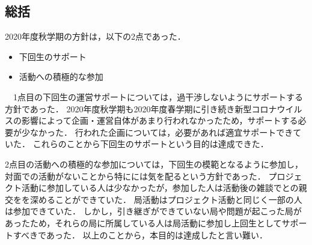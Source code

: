 \subsection*{\thirdGrade{}総括}


2020年度秋学期の\thirdGrade{}方針は，以下の2点であった．
\begin{itemize}
  \item 下回生のサポート
  \item 活動への積極的な参加
\end{itemize}
　1点目の下回生の運営サポートについては，過干渉しないようにサポートする方針であった．
2020年度秋学期も2020年度春学期に引き続き新型コロナウイルスの影響によって企画・運営自体があまり行われなかったため，サポートする必要が少なかった．
行われた企画については，必要があれば適宜サポートできていた．
これらのことから下回生のサポートという目的は達成できた．

2点目の活動への積極的な参加については，下回生の模範となるように参加し，対面での活動がないことから特に\firstGrade{}には気を配るという方針であった．
プロジェクト活動に参加している人は少なかったが，参加した人は活動後の雑談で\firstGrade{}との親交をを深めることができていた．
局活動はプロジェクト活動と同じく一部の人は参加できていた．
しかし，引き継ぎができていない局や問題が起こった局があったため，それらの局に所属している人は局活動に参加し上回生としてサポートすべきであった．
以上のことから，本目的は達成したと言い難い．
